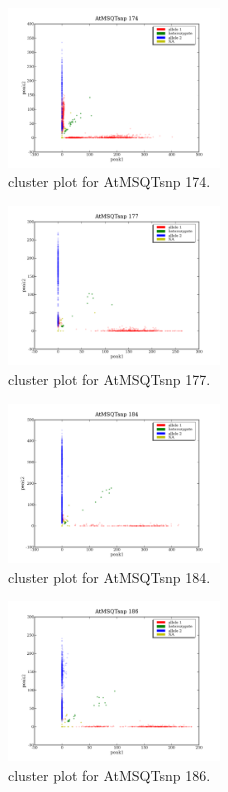\begin{figure}[H]
\includegraphics[width=0.5\textwidth]{figures/cluster_plot_AtMSQTsnp_174.png}
\caption{cluster plot for AtMSQTsnp 174.} \label{flAtMSQTsnp174}
\end{figure}
\begin{figure}[H]
\includegraphics[width=0.5\textwidth]{figures/cluster_plot_AtMSQTsnp_177.png}
\caption{cluster plot for AtMSQTsnp 177.} \label{flAtMSQTsnp177}
\end{figure}
\begin{figure}[H]
\includegraphics[width=0.5\textwidth]{figures/cluster_plot_AtMSQTsnp_184.png}
\caption{cluster plot for AtMSQTsnp 184.} \label{flAtMSQTsnp184}
\end{figure}
\begin{figure}[H]
\includegraphics[width=0.5\textwidth]{figures/cluster_plot_AtMSQTsnp_186.png}
\caption{cluster plot for AtMSQTsnp 186.} \label{flAtMSQTsnp186}
\end{figure}
